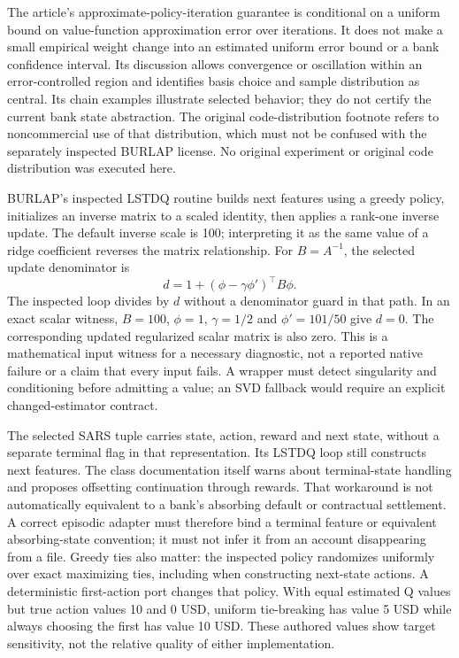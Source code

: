 The article's approximate-policy-iteration guarantee is conditional on a uniform bound on value-function approximation error over iterations. It does not make a small empirical weight change into an estimated uniform error bound or a bank confidence interval. Its discussion allows convergence or oscillation within an error-controlled region and identifies basis choice and sample distribution as central. Its chain examples illustrate selected behavior; they do not certify the current bank state abstraction. The original code-distribution footnote refers to noncommercial use of that distribution, which must not be confused with the separately inspected BURLAP license. No original experiment or original code distribution was executed here.~\citep{exec24_policyjava_lspi}

BURLAP's inspected LSTDQ routine builds next features using a greedy policy, initializes an inverse matrix to a scaled identity, then applies a rank-one inverse update. The default inverse scale is 100; interpreting it as the same value of a ridge coefficient reverses the matrix relationship. For $B=A^{-1}$, the selected update denominator is
\[
 d=1+(\phi-\gamma\phi')^\top B\phi.
\]
The inspected loop divides by $d$ without a denominator guard in that path. In an exact scalar witness, $B=100$, $\phi=1$, $\gamma=1/2$ and $\phi'=101/50$ give $d=0$. The corresponding updated regularized scalar matrix is also zero. This is a mathematical input witness for a necessary diagnostic, not a reported native failure or a claim that every input fails. A wrapper must detect singularity and conditioning before admitting a value; an SVD fallback would require an explicit changed-estimator contract.~\citep{exec24_policyjava_burlap,exec24_policyjava_comparison}

The selected SARS tuple carries state, action, reward and next state, without a separate terminal flag in that representation. Its LSTDQ loop still constructs next features. The class documentation itself warns about terminal-state handling and proposes offsetting continuation through rewards. That workaround is not automatically equivalent to a bank's absorbing default or contractual settlement. A correct episodic adapter must therefore bind a terminal feature or equivalent absorbing-state convention; it must not infer it from an account disappearing from a file. Greedy ties also matter: the inspected policy randomizes uniformly over exact maximizing ties, including when constructing next-state actions. A deterministic first-action port changes that policy. With equal estimated Q values but true action values 10 and 0 USD, uniform tie-breaking has value 5 USD while always choosing the first has value 10 USD. These authored values show target sensitivity, not the relative quality of either implementation.~\citep{exec24_policyjava_burlap,exec24_policyjava_comparison}

